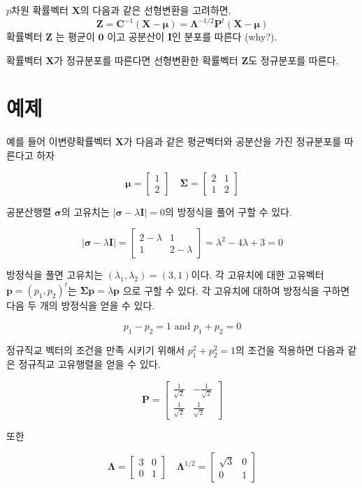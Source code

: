 \documentclass[
  11pt,
  a4paper,
  oneside]{scrbook}
\theoremstyle{definition}
\theoremstyle{plain}
\theoremstyle{definition}
\theoremstyle{definition}
\theoremstyle{remark}
\begin{document}
\(p\)차원 확률벡터 \(\pmb X\)의 다음과 같은 선형변환을 고려하면.
\[ \pmb Z = \pmb C^{-1} ( \pmb X- \pmb \mu) = \pmb \Lambda^{-1/2} \pmb P^t ( \pmb X- \pmb \mu)  \]
확률벡터 \(\pmb Z\) 는 평균이 \(\pmb 0\) 이고 공분산이 \(\pmb I\)인
분포를 따른다 (why?).

확률벡터 \(\pmb X\)가 정규분포를 따른다면 선형변환한 확률벡터
\(\pmb Z\)도 정규분포를 따른다.

\section{예제}\label{uxc608uxc81c-1}

예를 들어 이변량확률벡터 \(\pmb X\)가 다음과 같은 평균벡터와 공분산을
가진 정규분포를 따른다고 하자

\[
\pmb \mu =
  \begin{bmatrix}
1\\
2
\end{bmatrix}
\quad
\pmb \Sigma =
  \begin{bmatrix}
2 & 1\\
1 & 2
\end{bmatrix}
\]

공분산행렬 \(\pmb \sigma\)의 고유치는
\(|\pmb \sigma -\lambda \pmb I|=0\)의 방정식을 풀어 구할 수 있다.

\[
|\pmb \sigma -\lambda \pmb I|  =
  \begin{bmatrix}
2-\lambda & 1\\
1 & 2-\lambda
\end{bmatrix}
= \lambda^2 -4 \lambda +3=0
\]

방정식을 풀면 고유치는 \((\lambda_1, \lambda_2) = (3,1)\)이다. 각
고유치에 대한 고유벡터 \(\pmb p=(p_1, p_2)^t\)는
\(\pmb \Sigma \pmb p = \lambda \pmb p\) 으로 구할 수 있다. 각 고유치에
대하여 방정식을 구하면 다음 두 개의 방정식을 얻을 수 있다.

\[
p_1 - p_2 = 1 \text{ and } p_1 + p_2 = 0
\]

정규직교 벡터의 조건을 만족 시키기 위해서 \(p^2_1 + p^2_2=1\)의 조건을
적용하면 다음과 같은 정규직교 고유행렬을 얻을 수 있다.

\[
\pmb P =
  \begin{bmatrix}
\frac{1}{\sqrt{2}} & -\frac{1}{\sqrt{2}}\\
\frac{1}{\sqrt{2}} & \frac{1}{\sqrt{2}}
\end{bmatrix}
\]

또한

\[
\pmb \Lambda =
  \begin{bmatrix}
3 & 0\\
0 & 1
\end{bmatrix}
\quad
\pmb \Lambda^{1/2} =
  \begin{bmatrix}
\sqrt{3} & 0\\
0 & 1
\end{bmatrix}
\]
\end{document}
